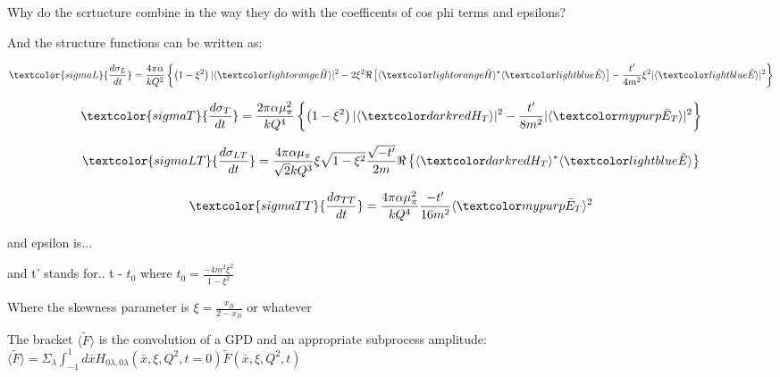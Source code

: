     
    Why do the scrtucture combine in the way they do with the coefficents of cos phi terms and epsilons?
    
    And the structure functions can be written as:

    \begin{equation}
         \textcolor{sigmaL}{\frac{d\sigma_{L}}{dt}} = 
        \frac{4\pi\alpha}{kQ^2}\left\{ \left( 1 - \xi^2 \right) 
        \lvert \langle \GPDHtildeEQ \rangle \rvert ^2 
        -2\xi^2 \Re \left[  \langle \GPDHtildeEQ \rangle ^* \langle \GPDEtildeEQ \rangle    \right] - \frac{t'}{4m^2}\xi^2
        \lvert \langle \GPDEtildeEQ \rangle \rvert ^2  \right\}
    \end{equation} 
  
    \begin{equation}
        \textcolor{sigmaT}{\frac{d\sigma_{T}}{dt}} = 
        \frac{2\pi\alpha \mu_{\pi}^2}{kQ^4}
        \left\{ \left( 1 - \xi^2 \right) 
        \lvert \langle \GPDHTEQ \rangle \rvert ^2
        - \frac{t'}{8m^2}
        \lvert \langle \GPDETbarEQ \rangle \rvert ^2  \right\}    
    \end{equation} 
    
    \begin{equation}
        \textcolor{sigmaLT}{\frac{d\sigma_{LT}}{dt}} = 
        \frac{4\pi\alpha \mu_{\pi}}{\sqrt{2}kQ^3}
        \xi\sqrt{1-\xi^2}
        \frac{\sqrt{-t'}}{2m}
        \Re \left\{ 
         \langle \GPDHTEQ \rangle ^*
        \langle \GPDEtildeEQ \rangle   
        \right\}
     \end{equation} 
    
    
    \begin{equation}
        \textcolor{sigmaTT}{\frac{d\sigma_{TT}}{dt}} = 
        \frac{4\pi\alpha \mu_{\pi}^2}{kQ^4}
        \frac{-t'}{16m^2}
        \langle \GPDETbarEQ \rangle^2   
    \end{equation} 
        
    

    and epsilon is... 
    
    and t' stands for.. t - $t_0$ where $t_0 = \frac{-4m^2\xi^2}{1-\xi^2}$
    
    
    Where the skewness parameter is $\xi = \frac{x_B}{2-x_B}$ or whatever
    

    The bracket $\langle \tilde{F} \rangle$ is the convolution of a GPD and an appropriate subprocess amplitude:
    $
    \langle \tilde{F} \rangle =  \Sigma_{\lambda} \int_{-1}^{1} d\bar{x}H_{0\lambda,0\lambda}\left( \bar{x}, \xi, Q^2, t=0  \right)\tilde{F}\left( \bar{x}, \xi, Q^2, t  \right)\   
    $ 


